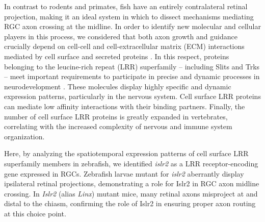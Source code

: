 In contrast to rodents and primates, fish have an entirely contralateral retinal projection, making it an ideal system in which to dissect mechanisms mediating RGC axon crossing at the midline.
In order to identify new molecular and cellular players in this process, we considered that both axon growth and guidance crucially depend on cell-cell and cell-extracellular matrix (ECM) interactions mediated by cell surface and secreted proteins
\cite{raper2010cellular}.
In this respect, proteins belonging to the leucine-rich repeat (LRR) superfamily – including Slits and Trks – meet important requirements to participate in precise and dynamic processes in neurodevelopment \cite{de2011role}.
These molecules display highly specific and dynamic expression patterns, particularly in the nervous system.
Cell surface LRR proteins can mediate low affinity interactions with their binding partners.
Finally, the number of cell surface LRR proteins is greatly expanded in vertebrates, correlating with the increased complexity of nervous and immune system organization.

Here, by analyzing the spatiotemporal expression patterns of cell surface LRR superfamily members in zebrafish, we identified \emph{islr2} as a LRR receptor-encoding gene expressed in RGCs.
Zebrafish larvae mutant for \emph{islr2} aberrantly display ipsilateral retinal projections, demonstrating a role for Islr2 in RGC axon midline crossing.
In \emph{Islr2} (alias \emph{Linx}) mutant mice, many retinal axons misproject at and distal to the chiasm, confirming the role of Islr2 in ensuring proper axon routing at this choice point.
